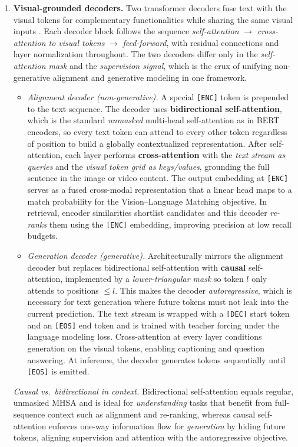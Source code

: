 \begin{enrichment}
\begin{enrichment}
\begin{enumerate}
            \item \textbf{Visual-grounded decoders.} Two transformer decoders fuse text with the visual tokens for complementary functionalities while sharing the same visual inputs \cite{wang2022_omnivl}. Each decoder block follows the sequence \emph{self-attention} \(\rightarrow\) \emph{cross-attention to visual tokens} \(\rightarrow\) \emph{feed-forward}, with residual connections and layer normalization throughout. The two decoders differ only in the \emph{self-attention mask} and the \emph{supervision signal}, which is the crux of unifying non-generative alignment and generative modeling in one framework.
            \begin{itemize}
                \item \emph{Alignment decoder (non-generative).} A special \texttt{[ENC]} token is prepended to the text sequence. The decoder uses \textbf{bidirectional self-attention}, which is the standard \emph{unmasked} multi-head self-attention as in BERT encoders, so every text token can attend to every other token regardless of position to build a globally contextualized representation. After self-attention, each layer performs \textbf{cross-attention} with the \emph{text stream as queries} and the \emph{visual token grid as keys/values}, grounding the full sentence in the image or video content. The output embedding at \texttt{[ENC]} serves as a fused cross-modal representation that a linear head maps to a match probability for the Vision–Language Matching objective. In retrieval, encoder similarities shortlist candidates and this decoder \emph{re-ranks} them using the \texttt{[ENC]} embedding, improving precision at low recall budgets.
                \item \emph{Generation decoder (generative).} Architecturally mirrors the alignment decoder but replaces bidirectional self-attention with \textbf{causal} self-attention, implemented by a \emph{lower-triangular mask} so token \(l\) only attends to positions \(\le l\). This makes the decoder \emph{autoregressive}, which is necessary for text generation where future tokens must not leak into the current prediction. The text stream is wrapped with a \texttt{[DEC]} start token and an \texttt{[EOS]} end token and is trained with teacher forcing under the language modeling loss. Cross-attention at every layer conditions generation on the visual tokens, enabling captioning and question answering. At inference, the decoder generates tokens sequentially until \texttt{[EOS]} is emitted.
            \end{itemize}
            \emph{Causal vs.\ bidirectional in context.} Bidirectional self-attention equals regular, unmasked MHSA and is ideal for \emph{understanding} tasks that benefit from full-sequence context such as alignment and re-ranking, whereas causal self-attention enforces one-way information flow for \emph{generation} by hiding future tokens, aligning supervision and attention with the autoregressive objective.
            

\end{enumerate}
\end{enrichment}
\end{enrichment}

